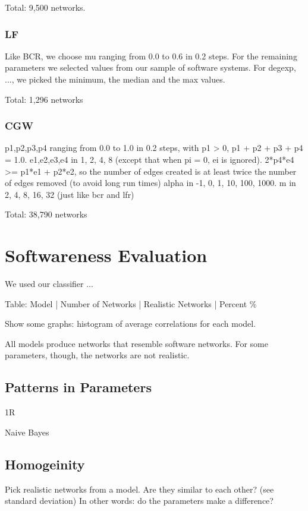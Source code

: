 Total: 9,500 networks.

\subsubsection{LF}

Like BCR, we choose mu ranging from 0.0 to 0.6 in 0.2 steps. For the remaining
parameters we selected values from our sample of software systems. For degexp,
..., we picked the minimum, the median and the max values.

Total: 1,296 networks

\subsubsection{CGW}

p1,p2,p3,p4 ranging from 0.0 to 1.0 in 0.2 steps, with p1 > 0, p1 + p2 + p3 + p4 = 1.0.
e1,e2,e3,e4 in 1, 2, 4, 8 (except that when pi = 0, ei is ignored).
2*p4*e4 >= p1*e1 + p2*e2, so the number of edges created is at least twice
the number of edges removed (to avoid long run times)
alpha in -1, 0, 1, 10, 100, 1000. 
m in 2, 4, 8, 16, 32 (just like bcr and lfr)

Total: 38,790 networks

\section{Softwareness Evaluation}

We used our classifier ...

Table: Model | Number of Networks | Realistic Networks | Percent \%

Show some graphs: histogram of average correlations for each model.

All models produce networks that resemble software networks.  For some
parameters, though, the networks are not realistic.

\subsection{Patterns in Parameters}

1R

Naive Bayes

\subsection{Homogeinity}

Pick realistic networks from a model. Are they similar to each other? (see
standard deviation) In other words: do the parameters make a difference?

